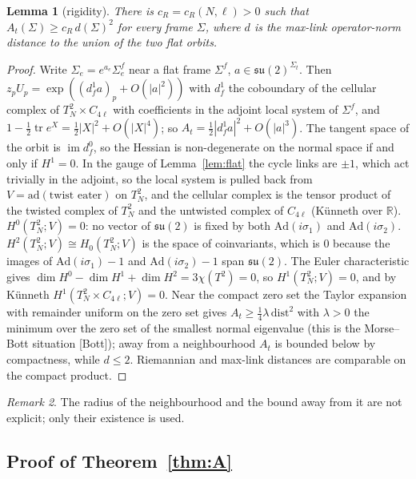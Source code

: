 \documentclass[11pt,a4paper]{article}
\newtheorem{lemma}{Lemma}[section]
\theoremstyle{definition}
\theoremstyle{remark}
\newtheorem{remark}[lemma]{Remark}
\newcommand{\tr}{\operatorname{tr}}
\begin{document}
\begin{lemma}[rigidity]\label{lem:rigid}
There is $c_R=c_R(N,\ell)>0$ such that $A_t(\Sigma)\ge c_R\,d(\Sigma)^2$ for every frame $\Sigma$, where $d$ is the max-link operator-norm distance to the union of the two flat orbits.
\end{lemma}
\begin{proof}
Write $\Sigma_e=e^{a_e}\Sigma^f_e$ near a flat frame $\Sigma^f$, $a\in\mathfrak{su}(2)^{\Sigma_t}$.
Then $z_pU_p=\exp((d^1_fa)_p+O(|a|^2))$ with $d^1_f$ the coboundary of the cellular complex of $T^2_N\times C_{4\ell}$ with coefficients in the adjoint local system of $\Sigma^f$, and $1-\frac12\tr e^X=\frac12|X|^2+O(|X|^4)$; so $A_t=\frac12|d^1_fa|^2+O(|a|^3)$.
The tangent space of the orbit is $\operatorname{im}d^0_f$, so the Hessian is non-degenerate on the normal space if and only if $H^1=0$.
In the gauge of Lemma~\ref{lem:flat} the cycle links are $\pm1$, which act trivially in the adjoint, so the local system is pulled back from $V=\mathrm{ad}(\text{twist eater})$ on $T^2_N$, and the cellular complex is the tensor product of the twisted complex of $T^2_N$ and the untwisted complex of $C_{4\ell}$ (Künneth over $\mathbb{R}$).
$H^0(T^2_N;V)=0$: no vector of $\mathfrak{su}(2)$ is fixed by both $\mathrm{Ad}(i\sigma_1)$ and $\mathrm{Ad}(i\sigma_2)$.
$H^2(T^2_N;V)\cong H_0(T^2_N;V)$ is the space of coinvariants, which is $0$ because the images of $\mathrm{Ad}(i\sigma_1)-1$ and $\mathrm{Ad}(i\sigma_2)-1$ span $\mathfrak{su}(2)$.
The Euler characteristic gives $\dim H^0-\dim H^1+\dim H^2=3\chi(T^2)=0$, so $H^1(T^2_N;V)=0$, and by Künneth $H^1(T^2_N\times C_{4\ell};V)=0$.
Near the compact zero set the Taylor expansion with remainder uniform on the zero set gives $A_t\ge\frac14\lambda\,\mathrm{dist}^2$ with $\lambda>0$ the minimum over the zero set of the smallest normal eigenvalue (this is the Morse--Bott situation [Bott]); away from a neighbourhood $A_t$ is bounded below by compactness, while $d\le2$. Riemannian and max-link distances are comparable on the compact product.
\end{proof}

\begin{remark}
The radius of the neighbourhood and the bound away from it are not explicit; only their existence is used.
\end{remark}

\subsection{Proof of Theorem~\ref{thm:A}}
\end{document}
